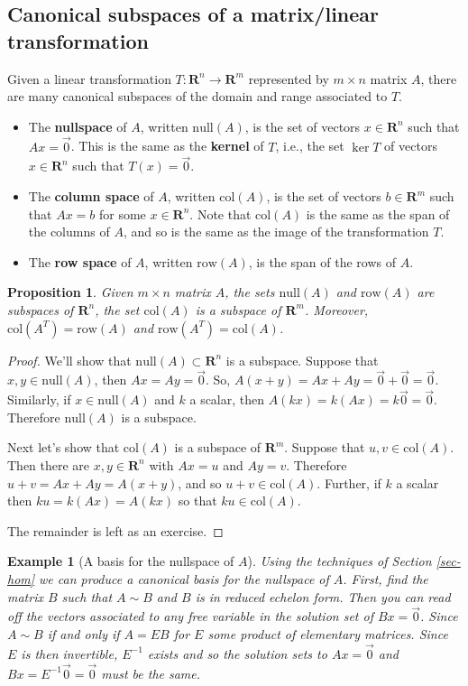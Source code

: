 \documentclass[12pt]{article}
\numberwithin{equation}{subsection}
\numberwithin{figure}{subsection}
\newtheorem{prop}[subsection]{Proposition}
\theoremstyle{note}
\newtheorem{example}[subsection]{Example}
\newcommand\nul[1]{\mathrm{null}(#1)}
\newcommand\col[1]{\mathrm{col}(#1)}
\newcommand\row[1]{\mathrm{row}(#1)}
\begin{document}
\subsection{Canonical subspaces of a matrix/linear transformation}

Given a linear transformation $T\colon \mathbf{R}^n\to\mathbf{R}^m$ represented by $m\times n$ matrix $A$, there are many canonical subspaces of the domain and range associated to $T$. 

\begin{itemize}
	\item The \textbf{nullspace} of $A$, written $\nul{A}$, is the set of vectors $x\in\mathbf{R}^n$ such that $Ax=\vec{0}$. This is the same as the \textbf{kernel} of $T$, i.e., the set $\ker T$ of vectors $x\in\mathbf{R}^n$ such that $T(x)=\vec{0}$.
	\item The \textbf{column space} of $A$, written $\col{A}$, is the set of vectors $b\in\mathbf{R}^m$ such that $Ax=b$ for some $x \in \mathbf{R}^n$. Note that $\col{A}$ is the same as the span of the columns of $A$, and so is the same as the image of the transformation $T$.
	\item The \textbf{row space} of $A$, written $\row{A}$, is the span of the rows of $A$. 
\end{itemize}

\begin{prop}
	Given $m\times n$ matrix $A$, the sets $\nul{A}$ and $\row{A}$ are subspaces of $\mathbf{R}^n$, the set $\col{A}$ is a subspace of $\mathbf{R}^m$. Moreover, $\col{A^T}=\row{A}$ and $\row{A^T}=\col{A}$.
\end{prop}

\begin{proof}
	We'll show that $\nul{A}\subset \mathbf{R}^n$ is a subspace. Suppose that $x,y\in \nul{A}$, then $Ax=Ay=\vec{0}$. So, $A(x+y)=Ax+Ay=\vec{0}+\vec{0}=\vec{0}$. Similarly, if $x\in \nul{A}$ and $k$ a scalar, then $A(kx)=k(Ax)=k\vec{0}=\vec{0}$. Therefore $\nul{A}$ is a subspace.
	
	Next let's show that $\col{A}$ is a subspace of $\mathbf{R}^m$. Suppose that $u,v\in \col{A}$. Then there are $x,y\in\mathbf{R}^n$ with $Ax=u$ and $Ay=v$. Therefore $u+v=Ax+Ay=A(x+y)$, and so $u+v\in \col{A}$. Further, if $k$ a scalar then $ku=k(Ax)=A(kx)$ so that $ku\in \col{A}$. 
	
	The remainder is left as an exercise. 
\end{proof}

\begin{example}[A basis for the nullspace of $A$]
	Using the techniques of Section \ref{sec-hom} we can produce a canonical basis for the nullspace of $A$. First, find the matrix $B$ such that $A\sim B$ and $B$ is in reduced echelon form. Then you can read off the vectors associated to any free variable in the solution set of $Bx=\vec{0}$. Since $A\sim B$ if and only if $A=EB$ for $E$ some product of elementary matrices. Since $E$ is then invertible, $E^{-1}$ exists and so the solution sets to $Ax=\vec{0}$ and $Bx=E^{-1}\vec{0}=\vec{0}$ must be the same.

\end{example}
\end{document}
